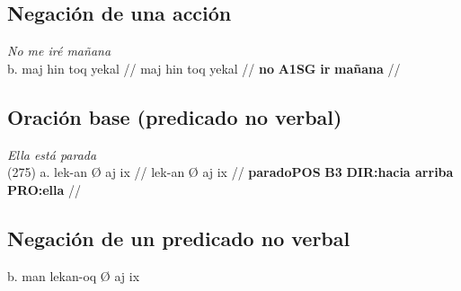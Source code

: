 \documentclass{article}%
\begin{document}
\subsection{Negación de una acción}%
\label{subsec:Negacindeunaaccin}%

%
\par\medskip%
\ex
\textit{No me iré mañana} \\
\begingl
\gla b. maj hin toq yekal //
\glb maj hin toq yekal //
\glc \textbf{no} \textbf{A1SG} \textbf{ir} \textbf{mañana} //
\endgl
\xe
%
\medskip%
\subsection{Oración base (predicado no verbal)}%
\label{subsec:Oracinbase(predicadonoverbal)}%

%
\par\medskip%
\ex
\textit{Ella está parada} \\
\begingl
\gla (275) a. lek-an Ø aj ix //
\glb lek-an Ø aj ix //
\glc \textbf{parado}\textbf{POS} \textbf{B3} \textbf{DIR:hacia arriba} \textbf{PRO:ella} //
\endgl
\xe
%
\medskip%
\subsection{Negación de un predicado no verbal}%
\label{subsec:Negacindeunpredicadonoverbal}%

%
b. man lekan{-}oq Ø aj ix 

%
\end{document}
